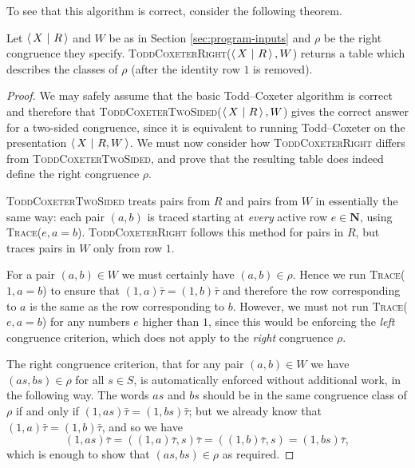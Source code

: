To see that this algorithm is correct, consider the following theorem.

\begin{theorem}
  Let $\left\langle\,X ~\middle|~ R\,\right\rangle$ and $W$ be as in Section \ref{sec:program-inputs} and $\rho$
  be the right congruence they specify.
  \textsc{ToddCoxeterRight}($\left\langle\,X ~\middle|~ R\,\right\rangle, W$) returns a table which describes the
  classes of $\rho$ (after the identity row $1$ is removed).
  \begin{proof}
    We may safely assume that the basic Todd--Coxeter algorithm is correct
    \cite{todd_coxeter_1936, beetham_campbell_1976} and therefore that
    \textsc{ToddCoxeterTwoSided($\left\langle\,X ~\middle|~ R\,\right\rangle, W$)} gives the correct answer for a
    two-sided congruence, since it is equivalent to running Todd--Coxeter on the
    presentation $\left\langle\,X ~\middle|~ R,W\,\right\rangle$.  We must now consider how
    \textsc{ToddCoxeterRight} differs from \textsc{ToddCoxeterTwoSided}, and
    prove that the resulting table does indeed define the right congruence
    $\rho$.

    \textsc{ToddCoxeterTwoSided} treats pairs from $R$ and pairs from $W$ in
    essentially the same way: each pair $(a,b)$ is traced starting at
    \textit{every} active row $e \in \mathbf{N}$, using
    \textsc{Trace}($e, a=b$).  \textsc{ToddCoxeterRight} follows this method for
    pairs in $R$, but traces pairs in $W$ only from row $1$.

    For a pair $(a,b) \in W$ we must certainly have $(a,b) \in \rho$.  Hence we
    run \textsc{Trace($1, a=b$)} to ensure that $(1,a)\bar\tau = (1,b)\bar\tau$
    and therefore the row corresponding to $a$ is the same as the row
    corresponding to $b$.  However, we must not run \textsc{Trace($e, a=b$)} for
    any numbers $e$ higher than $1$, since this would be enforcing the
    \textit{left} congruence criterion, which does not apply to the
    \textit{right} congruence $\rho$.

    The right congruence criterion, that for any pair $(a,b) \in W$ we have
    $(as, bs) \in \rho$ for all $s \in S$, is automatically enforced without
    additional work, in the following way.  The words $as$ and $bs$ should be in
    the same congruence class of $\rho$ if and only if
    $(1, as)\bar\tau = (1, bs)\bar\tau$; but we already know that
    $(1, a)\bar\tau = (1, b)\bar\tau$, and so we have
    $$(1, as)\bar\tau
    = ((1, a)\bar\tau, s)\bar\tau
    = ((1, b)\bar\tau, s)
    = (1, bs)\bar\tau,$$
    which is enough to show that $(as, bs) \in \rho$ as required.
  \end{proof}
\end{theorem}

